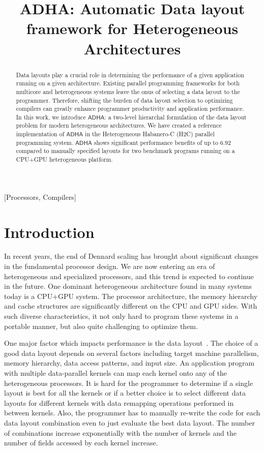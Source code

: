 \documentclass{sig-alternate-2013}
\newcommand{\ADHA}{\ensuremath{\mathsf{ADHA}}}
\begin{document}
\title{ADHA: Automatic Data layout framework for Heterogeneous Architectures}
\maketitle
\begin{abstract}
Data layouts play a crucial role in determining the performance
of a given
application running on a given architecture. 
Existing parallel programming frameworks for both multicore and heterogeneous
systems leave the onus of selecting a data layout to the programmer. Therefore, shifting the burden of data layout selection to optimizing compilers can greatly enhance programmer productivity and application performance. 
In this work, we introduce {\ADHA}: a two-level
hierarchal formulation of the data layout problem for modern heterogeneous
architectures. 
We have created a reference implementation of {\ADHA} in the 
Heterogeneous Habanero-C (H2C) parallel programming system. {\ADHA}
shows significant performance benefits of up to 6.92 compared to  manually specified layouts for two
benchmark programs running on a CPU+GPU heterogeneous platform.
\end{abstract}
\vspace*{-3pt}
[Processors, Compilers]
\vspace*{-3pt}
\section{Introduction}
In recent years, the end of Dennard scaling has brought about significant changes in the fundamental processor design. We are now entering an era of heterogeneous and specialized processors, and this trend is expected to continue in the future. One dominant heterogeneous architecture found in many systems today is a CPU+GPU system. The processor architecture, the memory hierarchy and cache structures are significantly different on the CPU and GPU sides. With such diverse characteristics, it not only hard to program these systems in a portable manner, but also quite challenging to optimize them.

One major factor which impacts performance is the data layout~\cite{dmajeti,sung}. The choice of a good data layout depends on several factors including target machine parallelism, memory hierarchy, data access patterns, and input size. An application program with multiple data-parallel kernels can map each kernel onto any of the heterogeneous processors. It is hard for the programmer to determine if a single layout is best for all the kernels or if a better choice is to select different data layouts for different kernels with data remapping operations performed in between kernels. Also, the programmer has to manually re-write the code for each data layout combination even to just evaluate the best data layout. The number of combinations increase exponentially with the number of kernels and the number of fields accessed by each kernel increase.
\end{document}
